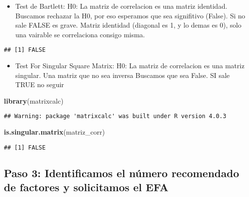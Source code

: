 \documentclass[
]{article}
\newenvironment{Shaded}{\begin{snugshade}}{\end{snugshade}}
\newcommand{\DataTypeTok}[1]{\textcolor[rgb]{0.13,0.29,0.53}{#1}}
\newcommand{\FloatTok}[1]{\textcolor[rgb]{0.00,0.00,0.81}{#1}}
\newcommand{\KeywordTok}[1]{\textcolor[rgb]{0.13,0.29,0.53}{\textbf{#1}}}
\newcommand{\NormalTok}[1]{#1}
\newcommand{\OperatorTok}[1]{\textcolor[rgb]{0.81,0.36,0.00}{\textbf{#1}}}
\providecommand{\tightlist}{%
  \setlength{\itemsep}{0pt}\setlength{\parskip}{0pt}}
\begin{document}
\begin{itemize}
\tightlist
\item
  Test de Bartlett: H0: La matriz de correlacion es una matriz
  identidad. Buscamos rechazar la H0, por eso esperamos que sea
  signifitivo (False). Si no sale FALSE es grave. Matriz identidad
  (diagonal es 1, y lo demas es 0), solo una vairable se correlaciona
  consigo misma.
\end{itemize}

\begin{Shaded}
\end{Shaded}

\begin{verbatim}
## [1] FALSE
\end{verbatim}

\begin{itemize}
\tightlist
\item
  Test For Singular Square Matrix: H0: La matriz de correlacion es una
  matriz singular. Una matriz que no sea inversa Buscamos que sea False.
  SI sale TRUE no seguir
\end{itemize}

\begin{Shaded}
\begin{Highlighting}[]
\KeywordTok{library}\NormalTok{(matrixcalc)}
\end{Highlighting}
\end{Shaded}

\begin{verbatim}
## Warning: package 'matrixcalc' was built under R version 4.0.3
\end{verbatim}

\begin{Shaded}
\begin{Highlighting}[]
\KeywordTok{is.singular.matrix}\NormalTok{(matriz_corr)}
\end{Highlighting}
\end{Shaded}

\begin{verbatim}
## [1] FALSE
\end{verbatim}

\hypertarget{paso-3-identificamos-el-nuxfamero-recomendado-de-factores-y-solicitamos-el-efa}{%
\subsection{Paso 3: Identificamos el número recomendado de factores y
solicitamos el
EFA}\label{paso-3-identificamos-el-nuxfamero-recomendado-de-factores-y-solicitamos-el-efa}}
\end{document}
